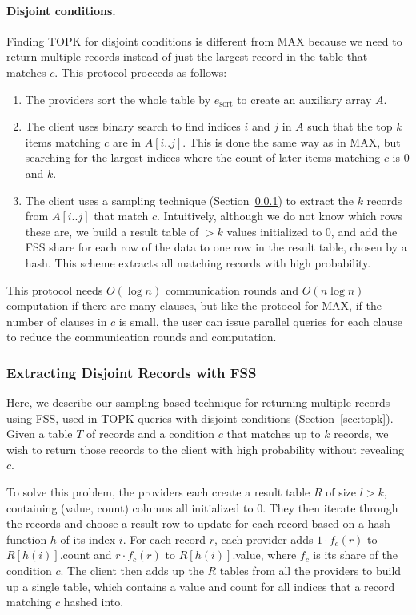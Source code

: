 \paragraph{Disjoint conditions.}
Finding TOPK for disjoint conditions is different from MAX because we need to return
multiple records instead of just the largest record in the table that matches $c$.
This protocol proceeds as follows:
\begin{enumerate}
	\item The providers sort the whole table by $e_\mathrm{sort}$ to create an auxiliary array $A$.
	\item The client uses binary search to find indices $i$ and $j$ in $A$ such that the top $k$
	items matching $c$ are in $A[i..j]$. This is done the same way as in MAX, but searching for
	the largest indices where the count of later items matching $c$ is 0 and $k$.
	\item The client uses a sampling technique (Section~\ref{sec:sampling}) to extract
	the $k$ records from $A[i..j]$ that match $c$. Intuitively, although we do not know which rows
	these are, we build a result table of $>k$ values initialized to 0, and add the FSS share
	for each row of the data to one row in the result
	table, chosen by a hash. This scheme extracts all matching
	records with high probability.
\end{enumerate}
This protocol needs $O(\log n)$ communication rounds
and $O(n \log n)$ computation if there are many clauses, but like the protocol for MAX,
if the number of clauses in $c$ is small,
the user can issue parallel queries for each clause to reduce the communication rounds
and computation.

\subsubsection{Extracting Disjoint Records with FSS}
\label{sec:sampling}

Here, we describe our sampling-based technique for returning multiple records using FSS, used in TOPK queries with disjoint conditions (Section~\ref{sec:topk}).
Given a table $T$ of records and a condition $c$ that matches up to $k$ records, we wish to return those records to the client with high probability without revealing $c$.

To solve this problem, the providers each create a result table $R$ of size $l > k$, containing (value, count) columns all initialized to 0.
They then iterate through the records and choose a result row to update for each record based on a hash function $h$ of its index $i$.
For each record $r$, each provider adds $1 \cdot f_c(r)$ to $R[h(i)]$.count
and $r \cdot f_c(r)$ to $R[h(i)]$.value, where $f_c$ is its share of the condition $c$.
The client then adds up the $R$ tables from all the providers to build up a single table,
which contains a value and count for all indices that a record matching $c$ hashed into.

